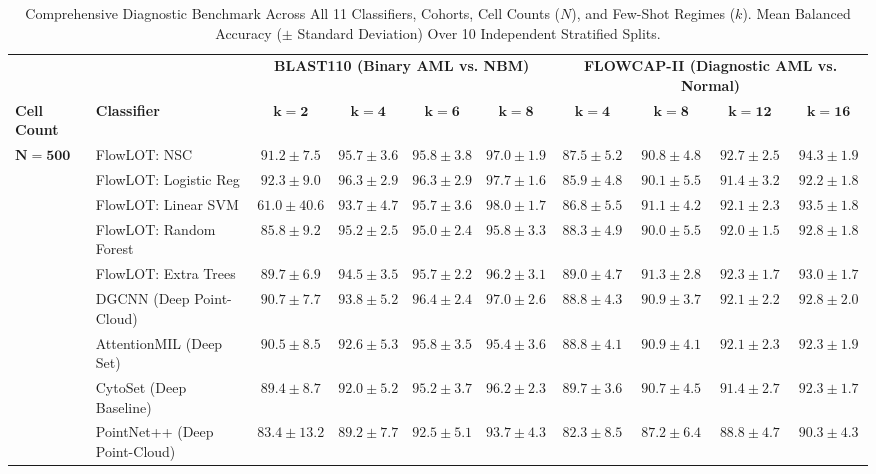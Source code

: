 \documentclass[10pt,journal,compsoc]{IEEEtran}
\begin{document}
\begin{table}[t]
\centering
\caption{Comprehensive Diagnostic Benchmark Across All 11 Classifiers, Cohorts, Cell Counts ($N$), and Few-Shot Regimes ($k$). Mean Balanced Accuracy ($\pm$ Standard Deviation) Over 10 Independent Stratified Splits.}
\label{tab:performance_summary}
\scriptsize
\setlength{\tabcolsep}{2.5pt}
\begin{tabular}{ll cccc cccc}
\toprule
& & \multicolumn{4}{c}{\textbf{BLAST110 (Binary AML vs. NBM)}} & \multicolumn{4}{c}{\textbf{FLOWCAP-II (Diagnostic AML vs. Normal)}} \\
\cmidrule(lr){3-6} \cmidrule(lr){7-10}
\textbf{Cell Count} & \textbf{Classifier} & $\mathbf{k=2}$ & $\mathbf{k=4}$ & $\mathbf{k=6}$ & $\mathbf{k=8}$ & $\mathbf{k=4}$ & $\mathbf{k=8}$ & $\mathbf{k=12}$ & $\mathbf{k=16}$ \\
\midrule
\multirow{11}{*}{$\mathbf{N = 500}$} & FlowLOT: NSC & $91.2 \pm 7.5$ & $95.7 \pm 3.6$ & $95.8 \pm 3.8$ & $97.0 \pm 1.9$ & $87.5 \pm 5.2$ & $90.8 \pm 4.8$ & $92.7 \pm 2.5$ & $94.3 \pm 1.9$ \\
 & FlowLOT: Logistic Reg & $92.3 \pm 9.0$ & $96.3 \pm 2.9$ & $96.3 \pm 2.9$ & $97.7 \pm 1.6$ & $85.9 \pm 4.8$ & $90.1 \pm 5.5$ & $91.4 \pm 3.2$ & $92.2 \pm 1.8$ \\
 & FlowLOT: Linear SVM & $61.0 \pm 40.6$ & $93.7 \pm 4.7$ & $95.7 \pm 3.6$ & $98.0 \pm 1.7$ & $86.8 \pm 5.5$ & $91.1 \pm 4.2$ & $92.1 \pm 2.3$ & $93.5 \pm 1.8$ \\
 & FlowLOT: Random Forest & $85.8 \pm 9.2$ & $95.2 \pm 2.5$ & $95.0 \pm 2.4$ & $95.8 \pm 3.3$ & $88.3 \pm 4.9$ & $90.0 \pm 5.5$ & $92.0 \pm 1.5$ & $92.8 \pm 1.8$ \\
 & FlowLOT: Extra Trees & $89.7 \pm 6.9$ & $94.5 \pm 3.5$ & $95.7 \pm 2.2$ & $96.2 \pm 3.1$ & $89.0 \pm 4.7$ & $91.3 \pm 2.8$ & $92.3 \pm 1.7$ & $93.0 \pm 1.7$ \\
 & DGCNN (Deep Point-Cloud) & $90.7 \pm 7.7$ & $93.8 \pm 5.2$ & $96.4 \pm 2.4$ & $97.0 \pm 2.6$ & $88.8 \pm 4.3$ & $90.9 \pm 3.7$ & $92.1 \pm 2.2$ & $92.8 \pm 2.0$ \\
 & AttentionMIL (Deep Set) & $90.5 \pm 8.5$ & $92.6 \pm 5.3$ & $95.8 \pm 3.5$ & $95.4 \pm 3.6$ & $88.8 \pm 4.1$ & $90.9 \pm 4.1$ & $92.1 \pm 2.3$ & $92.3 \pm 1.9$ \\
 & CytoSet (Deep Baseline) & $89.4 \pm 8.7$ & $92.0 \pm 5.2$ & $95.2 \pm 3.7$ & $96.2 \pm 2.3$ & $89.7 \pm 3.6$ & $90.7 \pm 4.5$ & $91.4 \pm 2.7$ & $92.3 \pm 1.7$ \\
 & PointNet++ (Deep Point-Cloud) & $83.4 \pm 13.2$ & $89.2 \pm 7.7$ & $92.5 \pm 5.1$ & $93.7 \pm 4.3$ & $82.3 \pm 8.5$ & $87.2 \pm 6.4$ & $88.8 \pm 4.7$ & $90.3 \pm 4.3$ \\

\end{tabular}
\end{table}
\end{document}
